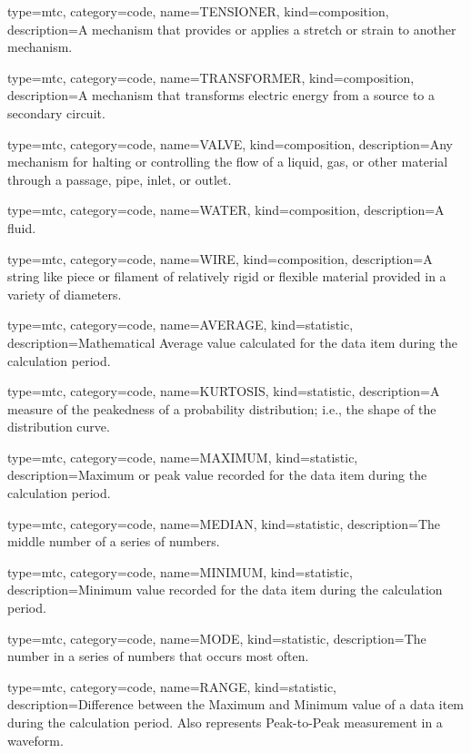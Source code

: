 {
  type=mtc,
  category=code,
  name={TENSIONER},
  kind={composition},
  description={A mechanism that provides or applies a stretch or strain to another mechanism.}
}


{
  type=mtc,
  category=code,
  name={TRANSFORMER},
  kind={composition},
  description={A mechanism that transforms electric energy from a source to a secondary circuit.}
}


{
  type=mtc,
  category=code,
  name={VALVE},
  kind={composition},
  description={Any mechanism for halting or controlling the flow of a liquid, gas, or other material through a passage, pipe, inlet, or outlet.}
}


{
  type=mtc,
  category=code,
  name={WATER},
  kind={composition},
  description={A fluid.}
}


{
  type=mtc,
  category=code,
  name={WIRE},
  kind={composition},
  description={A string like piece or filament of relatively rigid or flexible material provided in a variety of diameters.}
}


{
  type=mtc,
  category=code,
  name={AVERAGE},
  kind={statistic},
  description={Mathematical Average value calculated for the data item during the calculation period.}
}


{
  type=mtc,
  category=code,
  name={KURTOSIS},
  kind={statistic},
  description={A measure of the peakedness of a probability distribution; i.e., the shape of the distribution curve.}
}


{
  type=mtc,
  category=code,
  name={MAXIMUM},
  kind={statistic},
  description={Maximum or peak value recorded for the data item during the calculation period.}
}


{
  type=mtc,
  category=code,
  name={MEDIAN},
  kind={statistic},
  description={The middle number of a series of numbers.}
}


{
  type=mtc,
  category=code,
  name={MINIMUM},
  kind={statistic},
  description={Minimum value recorded for the data item during the calculation period.}
}


{
  type=mtc,
  category=code,
  name={MODE},
  kind={statistic},
  description={The number in a series of numbers that occurs most often.}
}


{
  type=mtc,
  category=code,
  name={RANGE},
  kind={statistic},
  description={Difference between the Maximum and Minimum value of a data item during the calculation period.  Also represents Peak-to-Peak measurement in a waveform.}
}


